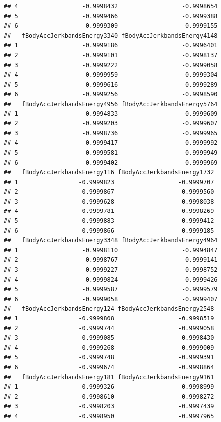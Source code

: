 \documentclass[
]{article}
\begin{document}
\begin{verbatim}
## 4                  -0.9998432                  -0.9998654
## 5                  -0.9999466                  -0.9999388
## 6                  -0.9999309                  -0.9999155
##   fBodyAccJerkbandsEnergy3340 fBodyAccJerkbandsEnergy4148
## 1                  -0.9999186                  -0.9996401
## 2                  -0.9999101                  -0.9998137
## 3                  -0.9999222                  -0.9999058
## 4                  -0.9999959                  -0.9999304
## 5                  -0.9999616                  -0.9999289
## 6                  -0.9999256                  -0.9998590
##   fBodyAccJerkbandsEnergy4956 fBodyAccJerkbandsEnergy5764
## 1                  -0.9994833                  -0.9999609
## 2                  -0.9999203                  -0.9999607
## 3                  -0.9998736                  -0.9999965
## 4                  -0.9999417                  -0.9999992
## 5                  -0.9999581                  -0.9999949
## 6                  -0.9999402                  -0.9999969
##   fBodyAccJerkbandsEnergy116 fBodyAccJerkbandsEnergy1732
## 1                 -0.9999823                  -0.9999707
## 2                 -0.9999867                  -0.9999560
## 3                 -0.9999628                  -0.9998038
## 4                 -0.9999781                  -0.9998269
## 5                 -0.9999883                  -0.9999412
## 6                 -0.9999866                  -0.9999185
##   fBodyAccJerkbandsEnergy3348 fBodyAccJerkbandsEnergy4964
## 1                  -0.9998110                  -0.9994847
## 2                  -0.9998767                  -0.9999141
## 3                  -0.9999227                  -0.9998752
## 4                  -0.9999824                  -0.9999426
## 5                  -0.9999587                  -0.9999579
## 6                  -0.9999058                  -0.9999407
##   fBodyAccJerkbandsEnergy124 fBodyAccJerkbandsEnergy2548
## 1                 -0.9999808                  -0.9998519
## 2                 -0.9999744                  -0.9999058
## 3                 -0.9999085                  -0.9998430
## 4                 -0.9999268                  -0.9999009
## 5                 -0.9999748                  -0.9999391
## 6                 -0.9999674                  -0.9998864
##   fBodyAccJerkbandsEnergy181 fBodyAccJerkbandsEnergy9161
## 1                 -0.9999326                  -0.9998999
## 2                 -0.9998610                  -0.9998272
## 3                 -0.9998203                  -0.9997439
## 4                 -0.9998950                  -0.9997965

\end{verbatim}
\end{document}
